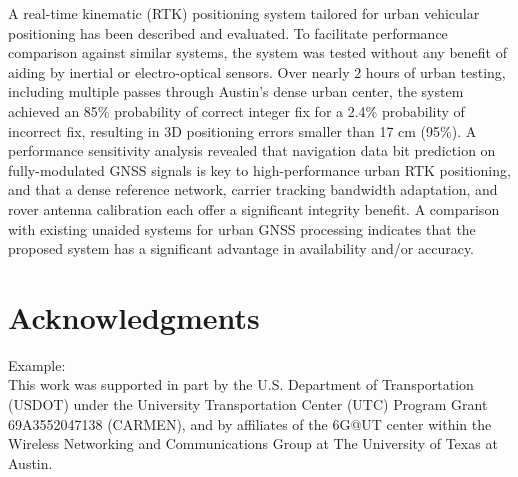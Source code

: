 \documentclass[10pt,journal,twocolumn]{IEEEtran} %
\begin{document}
A real-time kinematic (RTK) positioning system tailored for urban vehicular
positioning has been described and evaluated.  To facilitate performance
comparison against similar systems, the system was tested without any benefit
of aiding by inertial or electro-optical sensors.  Over nearly 2 hours of
urban testing, including multiple passes through Austin's dense urban center,
the system achieved an 85\% probability of correct integer fix for a 2.4\%
probability of incorrect fix, resulting in 3D positioning errors smaller than
17 cm (95\%).  A performance sensitivity analysis revealed that navigation
data bit prediction on fully-modulated GNSS signals is key to high-performance
urban RTK positioning, and that a dense reference network, carrier tracking
bandwidth adaptation, and rover antenna calibration each offer a significant
integrity benefit. A comparison with existing unaided systems for urban GNSS
processing indicates that the proposed system has a significant advantage in
availability and/or accuracy.

\section*{Acknowledgments}
Example:\\

This work was supported in part by the U.S. Department of Transportation (USDOT)
under the University Transportation Center (UTC) Program Grant 69A3552047138
(CARMEN), and by affiliates of the 6G@UT center within the Wireless Networking
and Communications Group at The University of Texas at Austin.

 

\end{document}
